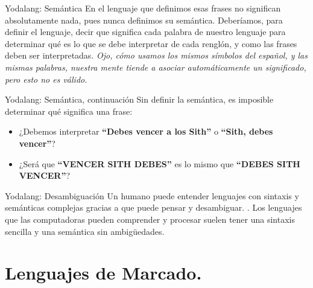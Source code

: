 
\begin{frame}{Yodalang: Semántica}
  En el lenguaje que definimos esas frases no significan absolutamente nada,
  pues nunca definimos su semántica.
  \jump
  Deberíamos, para definir el lenguaje, decir que significa cada palabra de
  nuestro lenguaje para determinar qué es lo que se debe interpretar de cada
  renglón, y como las frases deben ser interpretadas.
  \jump
  \textit{Ojo, cómo usamos los mismos símbolos del español, y las mismas
  palabras, nuestra mente tiende a asociar automáticamente un significado, pero
  esto no es válido.}
\end{frame}


\begin{frame}{Yodalang: Semántica, continuación}
  Sin definir la semántica, es imposible determinar qué significa una frase:
  \jump
  \begin{itemize}
    \item ¿Debemos interpretar \textbf{``Debes vencer a los Sith''} o
      \textbf{``Sith, debes vencer''}?
    \item ¿Será que \textbf{``VENCER SITH DEBES''} es lo mismo que
      \textbf{``DEBES SITH VENCER''}?
  \end{itemize}
\end{frame}


\begin{frame}{Yodalang: Desambiguación}
  Un humano puede entender lenguajes con sintaxis y semánticas complejas gracias
  a que puede pensar y desambiguar.
  \jump
  .
  \jump
  Los lenguajes que las computadoras pueden comprender y procesar suelen tener
  una sintaxis sencilla y una semántica sin ambigüedades.
\end{frame}


\section{Lenguajes de Marcado.}

